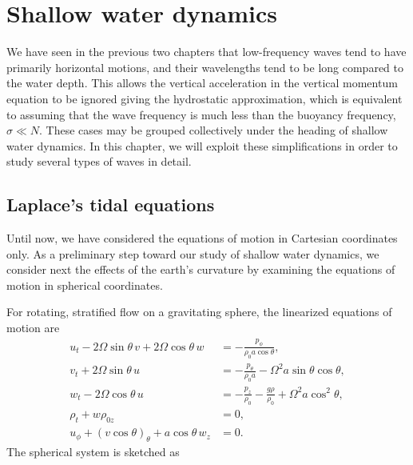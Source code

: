 
\setcounter{chapter}{4}

\chapter{Shallow water dynamics}

We have seen in the previous two chapters that low-frequency waves tend to have
primarily horizontal motions, and their wavelengths tend to be long compared to the
water depth. This allows the vertical acceleration in the vertical momentum equation
to be ignored giving the hydrostatic approximation, which is equivalent to assuming
that the wave frequency is much less than the buoyancy frequency, $\sigma\ll N$. These
cases may be grouped collectively under the heading of shallow water dynamics. In
this chapter, we will exploit these simplifications in order to study several types of
waves in detail.

\section{Laplace's tidal equations}

Until now, we have considered the equations of motion in Cartesian coordinates only.
As a preliminary step toward our study of shallow water dynamics, we consider next
the effects of the earth's curvature by examining the equations of motion in spherical
coordinates.

\sourcepagebreak

For rotating, stratified flow on a gravitating sphere, the linearized equations of
motion are
\begin{align*}
	u_t-2\Omega\sin\theta\,v+2\Omega\cos\theta\,w
	                                             & =-\frac{p_\phi}{\rho_0a\cos\theta},                              \\
	v_t+2\Omega\sin\theta\,u
	                                             & =-\frac{p_\theta}{\rho_0a}-\Omega^2a\sin\theta\cos\theta,        \\
	w_t-2\Omega\cos\theta\,u
	                                             & =-\frac{p_z}{\rho_0}-\frac{g\rho}{\rho_0}+\Omega^2a\cos^2\theta, \\
	\rho_t+w\rho_{0z}                            & =0,                                                              \\
	u_\phi+(v\cos\theta)_\theta+a\cos\theta\,w_z & =0.
\end{align*}
The spherical system is sketched as

